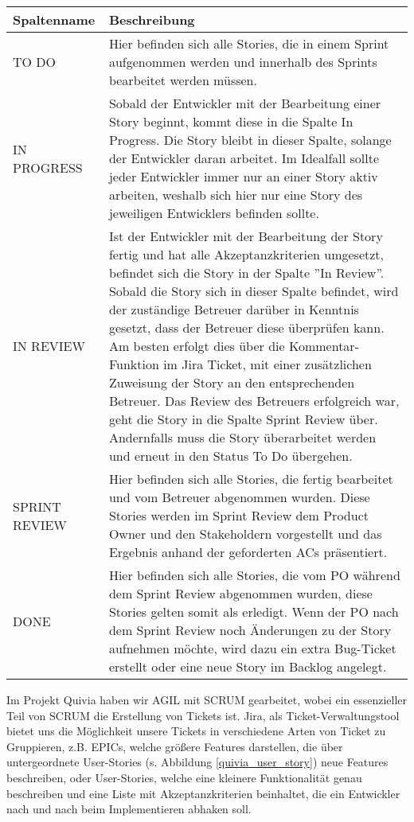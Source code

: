 \begin{xltabular}{\linewidth}{l|X}
    Spaltenname & Beschreibung \\
    \hline
    TO DO & Hier befinden sich alle Stories, die in einem Sprint aufgenommen werden und innerhalb des Sprints bearbeitet werden
    müssen. \\
    \hline
    \endfirsthead
    IN PROGRESS & Sobald der Entwickler mit der Bearbeitung einer Story beginnt, kommt diese in die Spalte In Progress.
    Die Story bleibt in dieser Spalte, solange der Entwickler daran arbeitet. Im Idealfall sollte jeder Entwickler
    immer nur an einer Story aktiv arbeiten, weshalb sich hier nur eine Story des jeweiligen Entwicklers befinden sollte. \\
    \hline
    IN REVIEW & Ist der Entwickler mit der Bearbeitung der Story fertig und hat alle Akzeptanzkriterien umgesetzt, befindet
    sich die Story in der Spalte ''In Review''. Sobald die Story sich in dieser Spalte befindet, wird der zuständige Betreuer
    darüber in Kenntnis gesetzt, dass der Betreuer diese überprüfen kann. Am besten erfolgt dies über die Kommentar-Funktion im 
    Jira Ticket, mit einer zusätzlichen Zuweisung der Story an den entsprechenden
    Betreuer. Das Review des Betreuers erfolgreich war, geht die Story in die Spalte Sprint Review über.
    Andernfalls muss die Story überarbeitet werden und erneut in den Status To Do übergehen. \\
    \hline
    SPRINT REVIEW & Hier befinden sich alle Stories, die fertig bearbeitet und vom Betreuer abgenommen wurden. Diese Stories
    werden im Sprint Review dem Product Owner und den Stakeholdern vorgestellt und das Ergebnis anhand der geforderten ACs präsentiert.  \\
    \hline
    DONE & Hier befinden sich alle Stories, die vom PO während dem Sprint Review abgenommen wurden, diese Stories gelten somit
    als erledigt. Wenn der PO nach dem Sprint Review noch Änderungen zu der Story aufnehmen möchte, wird
    dazu ein extra Bug-Ticket erstellt oder eine neue Story im Backlog angelegt.  \\
    \hline
\end{xltabular}

\par
Im Projekt Quivia haben wir AGIL mit SCRUM gearbeitet, wobei ein essenzieller Teil von SCRUM die Erstellung von Tickets ist.
Jira, als Ticket-Verwaltungstool bietet uns die Möglichkeit unsere Tickets in verschiedene Arten von Ticket zu Gruppieren, z.B.
EPICs, welche größere Features darstellen, die über untergeordnete User-Stories (s. Abbildung \ref{quivia_user_story}) neue Features beschreiben, oder User-Stories,
welche eine kleinere Funktionalität genau beschreiben und eine Liste mit Akzeptanzkriterien beinhaltet, die ein Entwickler nach und
nach beim Implementieren abhaken soll.

